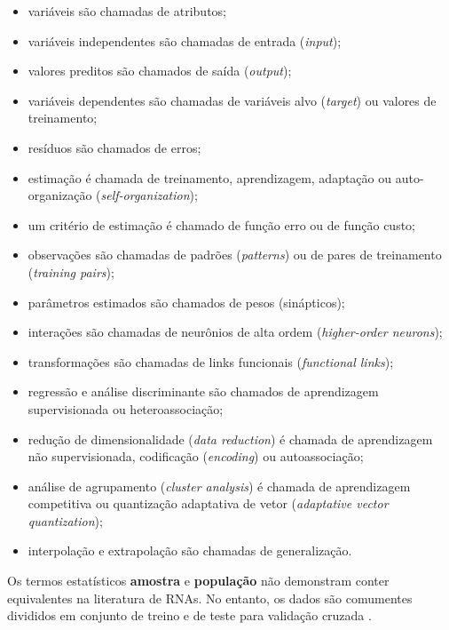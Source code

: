 \documentclass{automatextcc}
\begin{document}
\begin{itemize}
    \item variáveis são chamadas de atributos;
    \item variáveis independentes são chamadas de entrada (\textit{input});
    \item valores preditos são chamados de saída (\textit{output});
    \item variáveis dependentes são chamadas de variáveis alvo (\textit{target}) ou valores de treinamento;
    \item resíduos são chamados de erros;
    \item estimação é chamada de treinamento, aprendizagem, adaptação ou auto-organização (\textit{self-organization});
    \item um critério de estimação é chamado de função erro ou de função custo;
    \item observações são chamadas de padrões (\textit{patterns}) ou de pares de treinamento (\textit{training pairs});
    \item parâmetros estimados são chamados de pesos (sinápticos);
    \item interações são chamadas de neurônios de alta ordem (\textit{higher-order neurons});
    \item transformações são chamadas de links funcionais (\textit{functional links});
    \item regressão e análise discriminante são chamados de aprendizagem supervisionada ou heteroassociação;
    \item redução de dimensionalidade (\textit{data reduction}) é chamada de aprendizagem não supervisionada, codificação (\textit{encoding}) ou autoassociação;
    \item análise de agrupamento (\textit{cluster analysis}) é chamada de aprendizagem competitiva ou quantização adaptativa de vetor  (\textit{adaptative vector quantization});
    \item interpolação e extrapolação são chamadas de generalização.
\end{itemize}
Os termos estatísticos \textbf{amostra} e \textbf{população} não demonstram conter equivalentes na literatura de RNAs. No entanto, os dados são comumentes divididos em conjunto de treino e de teste para validação cruzada \citep{cheng1994}.
\end{document}
